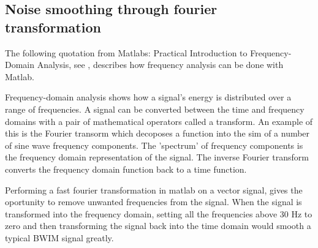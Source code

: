 \subsection{Noise smoothing through fourier transformation}
The following quotation from  Matlabs: Practical Introduction to Frequency-Domain Analysis, see \cite{frequency_domain_analysis}, describes how frequency analysis can be done with Matlab.
\begin{displayquote}
	Frequency-domain analysis shows how a signal's energy is distributed over a range of frequencies. A signal can be converted between the time and frequency domains with a pair of mathematical operators called a transform. An example of this is the Fourier transorm which decoposes a function into the sim of a number of sine wave frequency components. The 'spectrum' of frequency components is the frequency domain representation of the signal. The inverse Fourier transform converts the frequency domain function back to a time function.
\end{displayquote}

Performing a fast fourier transformation in matlab on a vector signal, gives the oportunity to remove unwanted frequencies from the signal. When the signal is transformed into the frequency domain, setting all the frequencies above 30 Hz to zero and then transforming the signal back into the time domain would smooth a typical BWIM signal greatly.
